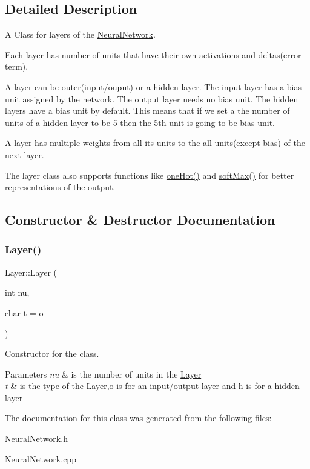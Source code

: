 \subsection{Detailed Description}
A Class for layers of the \hyperlink{classNeuralNetwork}{Neural\+Network}. 

Each layer has number of units that have their own activations and deltas(error term).

A layer can be outer(input/ouput) or a hidden layer. The input layer has a bias unit assigned by the network. The output layer needs no bias unit. The hidden layers have a bias unit by default. This means that if we set a the number of units of a hidden layer to be 5 then the 5th unit is going to be bias unit.

A layer has multiple weights from all its units to the all units(except bias) of the next layer.

The layer class also supports functions like \hyperlink{classLayer_a3a5f01e9bfb805b9eb3f28948faa10d6}{one\+Hot()} and \hyperlink{classLayer_aaf80bd74a6c446bd7474a771ba12c474}{soft\+Max()} for better representations of the output. 

\subsection{Constructor \& Destructor Documentation}
\mbox{\label{classLayer_ad4c9c9473c914874e42b16adf59f9d57}} 
\subsubsection{\texorpdfstring{Layer()}{Layer()}}
{\footnotesize\ttfamily Layer\+::\+Layer (\begin{DoxyParamCaption}\item[{int}]{nu,  }\item[{char}]{t = {\ttfamily \textquotesingle{}o\textquotesingle{}} }\end{DoxyParamCaption})}



Constructor for the class. 


\begin{DoxyParams}{Parameters}
{\em nu} & is the number of units in the \hyperlink{classLayer}{Layer} \\
\hline
{\em t} & is the type of the \hyperlink{classLayer}{Layer},\textquotesingle{}o\textquotesingle{} is for an input/output layer and \textquotesingle{}h\textquotesingle{} is for a hidden layer \\
\hline
\end{DoxyParams}


The documentation for this class was generated from the following files\+:\begin{DoxyCompactItemize}
\item 
Neural\+Network.\+h\item 
Neural\+Network.\+cpp\end{DoxyCompactItemize}
